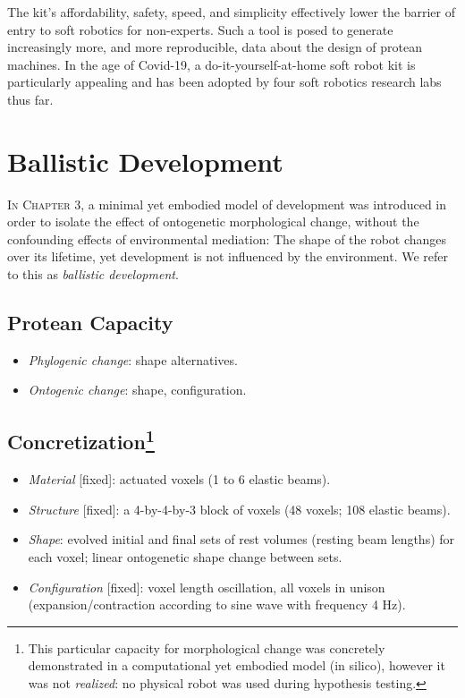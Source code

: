 The kit's affordability, safety, speed, and simplicity effectively lower the barrier of entry to soft robotics for non-experts.
Such a tool is posed to generate increasingly more, and more reproducible, data about the design of protean machines.
In the age of Covid-19, a do-it-yourself-at-home soft robot kit 
is particularly appealing and has been adopted by four soft robotics research labs thus far.



\section{Ballistic Development}


\textsc{In Chapter 3,}
a minimal yet embodied model of development was introduced in order to isolate the effect of ontogenetic morphological change,
without the confounding effects of environmental mediation:
The shape of the
robot changes over its lifetime, yet development is not influenced
by the environment.
We refer to this as \textit{ballistic development}.


\subsection{Protean Capacity}

\begin{itemize}
    \item \textit{Phylogenic change}: shape alternatives.
    \item \textit{Ontogenic change}: shape, configuration.
\end{itemize}


\subsection[Concretization]{Concretization\footnote{This particular capacity for morphological change was concretely demonstrated in a computational yet embodied model (in silico), however it was not \textit{realized}: no physical robot was used during hypothesis testing.}}

\begin{itemize}
    \item \textit{Material} [fixed]: actuated voxels (1 to 6 elastic beams).
    \item \textit{Structure} [fixed]: a 4-by-4-by-3 block of voxels (48 voxels; 108 elastic beams).
    \item \textit{Shape}: evolved initial and final sets of rest volumes (resting beam lengths) for each voxel; linear ontogenetic shape change between sets.
    \item \textit{Configuration} [fixed]: voxel length oscillation, all voxels in unison (expansion/contraction according to sine wave with frequency 4 Hz).
\end{itemize}


